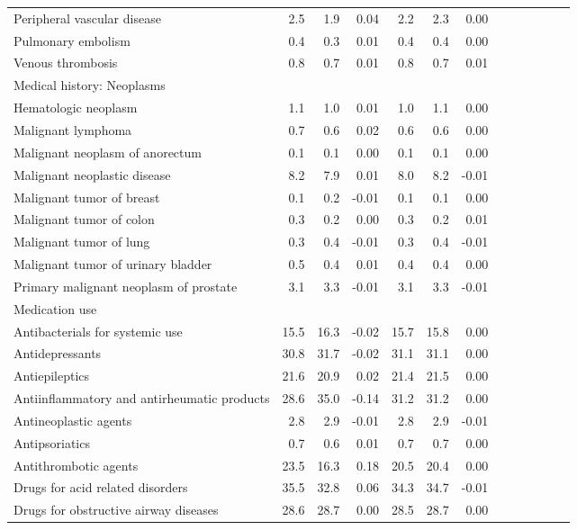\documentclass[11pt,]{article}
\begin{document}
\begin{longtable}{lrrrrrrrrrrrr}
      Peripheral vascular disease &  2.5 &  1.9 &  0.04 &  2.2 &  2.3 &  0.00 \\ 
      Pulmonary embolism &  0.4 &  0.3 &  0.01 &  0.4 &  0.4 &  0.00 \\ 
      Venous thrombosis &  0.8 &  0.7 &  0.01 &  0.8 &  0.7 &  0.01 \\ 
  Medical history: Neoplasms &    &    &     &    &    &     \\ 
      Hematologic neoplasm &  1.1 &  1.0 &  0.01 &  1.0 &  1.1 &  0.00 \\ 
      Malignant lymphoma &  0.7 &  0.6 &  0.02 &  0.6 &  0.6 &  0.00 \\ 
      Malignant neoplasm of anorectum &  0.1 &  0.1 &  0.00 &  0.1 &  0.1 &  0.00 \\ 
      Malignant neoplastic disease &  8.2 &  7.9 &  0.01 &  8.0 &  8.2 & -0.01 \\ 
      Malignant tumor of breast &  0.1 &  0.2 & -0.01 &  0.1 &  0.1 &  0.00 \\ 
      Malignant tumor of colon &  0.3 &  0.2 &  0.00 &  0.3 &  0.2 &  0.01 \\ 
      Malignant tumor of lung &  0.3 &  0.4 & -0.01 &  0.3 &  0.4 & -0.01 \\ 
      Malignant tumor of urinary bladder &  0.5 &  0.4 &  0.01 &  0.4 &  0.4 &  0.00 \\ 
      Primary malignant neoplasm of prostate &  3.1 &  3.3 & -0.01 &  3.1 &  3.3 & -0.01 \\ 
  Medication use &    &    &     &    &    &     \\ 
      Antibacterials for systemic use & 15.5 & 16.3 & -0.02 & 15.7 & 15.8 &  0.00 \\ 
      Antidepressants & 30.8 & 31.7 & -0.02 & 31.1 & 31.1 &  0.00 \\ 
      Antiepileptics & 21.6 & 20.9 &  0.02 & 21.4 & 21.5 &  0.00 \\ 
      Antiinflammatory and antirheumatic products & 28.6 & 35.0 & -0.14 & 31.2 & 31.2 &  0.00 \\ 
      Antineoplastic agents &  2.8 &  2.9 & -0.01 &  2.8 &  2.9 & -0.01 \\ 
      Antipsoriatics &  0.7 &  0.6 &  0.01 &  0.7 &  0.7 &  0.00 \\ 
      Antithrombotic agents & 23.5 & 16.3 &  0.18 & 20.5 & 20.4 &  0.00 \\ 
      Drugs for acid related disorders & 35.5 & 32.8 &  0.06 & 34.3 & 34.7 & -0.01 \\ 
      Drugs for obstructive airway diseases & 28.6 & 28.7 &  0.00 & 28.5 & 28.7 &  0.00 \\ 

\end{longtable}
\end{document}
